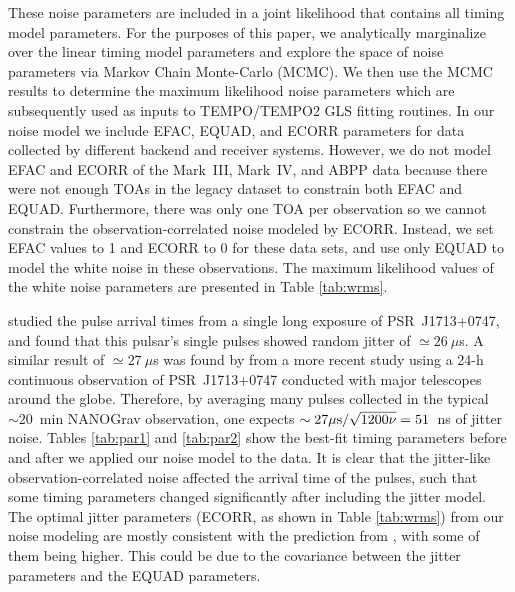 These noise parameters are included in a joint likelihood that contains all timing model parameters. For the purposes of this paper, we analytically marginalize over the linear timing model parameters and explore the space of noise parameters via Markov Chain Monte-Carlo (MCMC). We then use the MCMC results to determine the maximum likelihood noise parameters which are subsequently used as inputs to \textsc{TEMPO}/\textsc{TEMPO2} GLS fitting routines. 
In our noise model we include EFAC, EQUAD, and ECORR parameters
for data collected by different backend and receiver systems. However, we do not model 
EFAC and ECORR of the Mark~III, Mark~IV, and ABPP data because there were not
enough TOAs in the legacy dataset to constrain both EFAC and EQUAD. Furthermore,
there was only one TOA per observation so we cannot constrain the observation-correlated
noise modeled by ECORR. Instead, we set EFAC values to 1
and ECORR to 0 for these data sets, and use only EQUAD to model the white
noise in these observations. 
The maximum likelihood values of the white noise parameters are presented in Table \ref{tab:wrms}.






\citet{sc12} studied the pulse arrival times from a single long exposure of
PSR~J1713+0747, and found that this pulsar's single pulses showed random jitter of
$\simeq26~\mu$s. 
A similar result of $\simeq27~\mu$s was found by \citet{dlc+14} from a more recent study using a 24-h continuous observation of PSR~J1713+0747 conducted with major telescopes around the globe.
Therefore, by averaging many pulses collected in the typical
$\sim20$~min NANOGrav observation, one expects $\sim27\mu{\rm s}/\sqrt{1200\nu}=51$~ns of jitter noise. 
Tables \ref{tab:par1} and \ref{tab:par2} show the best-fit timing parameters before and
after we applied our noise model to the data. It is clear that the jitter-like
observation-correlated noise affected the arrival time of the pulses, such that 
some timing parameters changed significantly after including the jitter model.
The optimal jitter parameters (ECORR, as shown in Table \ref{tab:wrms}) from
our noise modeling are mostly consistent with the prediction from
\citet{sc12}, with some of them being higher. This could be due to the
covariance between the jitter parameters and the EQUAD parameters.

